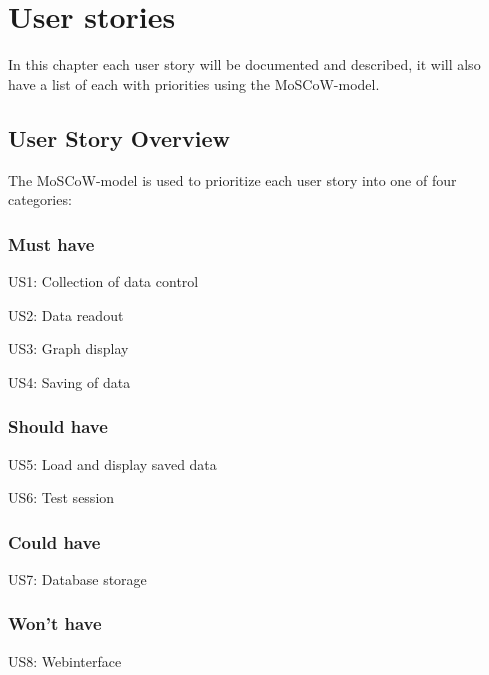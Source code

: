 
\chapter{User stories}
In this chapter each user story will be documented and described, it will also have a list of each with priorities using the MoSCoW-model.

\section{User Story Overview}
\label{sec:UserStoryOverview}

The MoSCoW-model is used to prioritize each user story into one of four categories:

\subsection{Must have}

US1: Collection of data control

US2: Data readout

US3: Graph display

US4: Saving of data

\subsection{Should have}

US5: Load and display saved data

US6: Test session

\subsection{Could have}

US7: Database storage

\subsection{Won't have}

US8: Webinterface